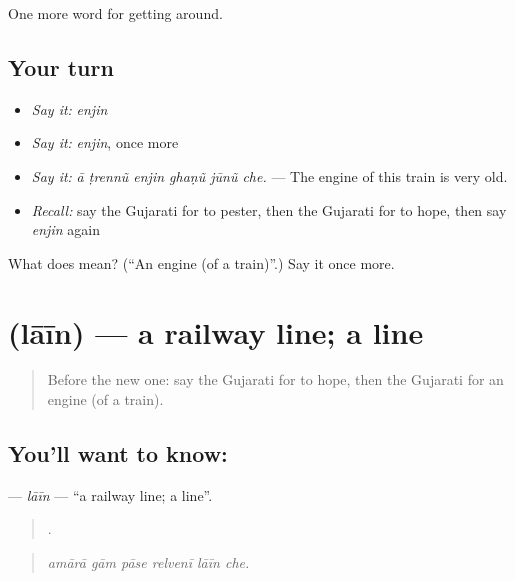 \begin{grammarlens}[title={What you've built}]
One more word for getting around.
\end{grammarlens}

\subsection*{Your turn}
\begin{itemize}
\raggedright
  \item \emph{Say it:} \emph{enjin}
  \item \emph{Say it:} \emph{enjin}, once more
  \item \emph{Say it:} \emph{ā ṭrennũ enjin ghaṇũ jūnũ che.} — The engine of this train is very old.
  \item \emph{Recall:} say the Gujarati for to pester, then the Gujarati for to hope, then say \emph{enjin} again
\end{itemize}

\begin{tcolorbox}[breakable,colback=teal!4,colframe=teal!35!black,title={Before you move on}]
What does  mean? (\textquotedblleft{}An engine (of a train)\textquotedblright{}.) Say it once more.
\end{tcolorbox}
\section[\texorpdfstring{\gu{લાઈન} (lāīn)}{લાઈન (lāīn)}]{ (lāīn) — a railway line; a line}

\label{lesson:GU-C393-lain}



\begin{quote}
Before the new one: say the Gujarati for to hope, then the Gujarati for an engine (of a train).
\end{quote}

\subsection*{You'll want to know: }
\textbf{} — \emph{lāīn} — \textquotedblleft{}a railway line; a line\textquotedblright{}.

\begin{quote}
     .
\end{quote}

\begin{quote}
\emph{amārā gām pāse relvenī lāīn che.}
\end{quote}

